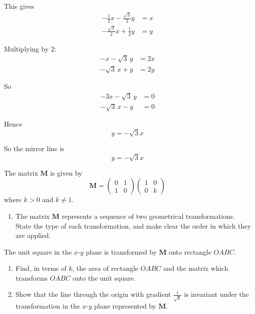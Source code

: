 \documentclass[leqno]{article}
\begin{document}
\begin{enumerate}[
  label=\textbf{\arabic*.},
  leftmargin=*,
  topsep=0pt,
  partopsep=0pt,
  parsep=0pt
]
\begin{djsSolution}
\begin{enumerate}[label=\textbf{(\roman*)}]
This gives
\begin{align*}
-\frac12x-\frac{\sqrt3}{2}y&=x\\
-\frac{\sqrt3}{2}x+\frac12y&=y
\end{align*}

Multiplying by \(2\):
\begin{align*}
-x-\sqrt3\,y&=2x\\
-\sqrt3\,x+y&=2y
\end{align*}

So
\begin{align*}
-3x-\sqrt3\,y&=0\\
-\sqrt3\,x-y&=0
\end{align*}

Hence
\[
y=-\sqrt3 x
\]

So the mirror line is
\[
y=-\sqrt3 x
\]
\end{enumerate}
\end{djsSolution}


\newpage

\questionitem

The matrix $\mathbf{M}$ is given by
\[
\mathbf{M} = \begin{pmatrix} 0 & 1 \\ 1 & 0 \end{pmatrix}\begin{pmatrix} 1 & 0 \\ 0 & k \end{pmatrix}
\]
where $k>0$ and $k \ne 1$. \\

\begin{enumerate}[label=\textbf{(\alph*)}]
  \item The matrix $\mathbf{M}$ represents a sequence of two geometrical transformations. State the type of each transformation, and make clear the order in which they are applied.  \\
\end{enumerate}

The unit square in the $x$-$y$ plane is transformed by $\mathbf{M}$ onto rectangle $OABC$. \\

\begin{enumerate}[label=\textbf{(\alph*)}, resume]
  \item Find, in terms of $k$, the area of rectangle $OABC$ and the matrix which transforms $OABC$ onto the unit square.  \\
  \item Show that the line through the origin with gradient $\frac{1}{\sqrt{k}}$ is invariant under the transformation in the $x$-$y$ plane represented by $\mathbf{M}$.  \\
\end{enumerate}


\end{enumerate}
\end{document}
